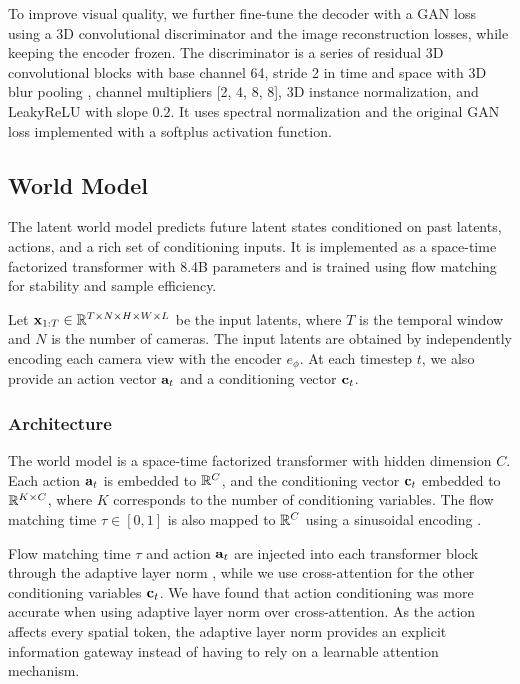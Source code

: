 To improve visual quality, we further fine-tune the decoder with a GAN loss \citep{esser21} using a 3D convolutional discriminator and the image reconstruction losses, while keeping the encoder frozen. The discriminator is a series of residual 3D convolutional blocks with base channel 64, stride 2 in time and space with 3D blur pooling \citep{zhang2019shiftinvar}, channel multipliers [2, 4, 8, 8], 3D instance normalization, and LeakyReLU with slope $0.2$. It uses spectral normalization \citep{miyato18} and the original GAN loss implemented with a softplus activation function.



\subsection{World Model}
The latent world model predicts future latent states conditioned on past latents, actions, and a rich set of conditioning inputs. It is implemented as a space-time factorized transformer with 8.4B parameters and is trained using flow matching~\cite{lipman23} for stability and sample efficiency.

Let ${\mathbf{x}}_{1:T} \in \mathbb{R}^{T \times N \times H \times W \times L}$ be the input latents, where $T$ is the temporal window and $N$ is the number of cameras. The input latents are obtained by independently encoding each camera view with the encoder $e_{\phi}$. At each timestep $t$, we also provide an action vector ${\mathbf{a}}_t$ and a conditioning vector ${\mathbf{c}}_t$.


\subsubsection{Architecture}

The world model is a space-time factorized transformer with hidden dimension $C$. Each action ${\mathbf{a}}_t$ is embedded to $\mathbb{R}^C$, and the conditioning vector ${\mathbf{c}}_t$ embedded to $\mathbb{R}^{K\times C}$, where $K$ corresponds to the number of conditioning variables. The flow matching time $\tau \in [0, 1]$ is also mapped to $\mathbb{R}^C$ using a sinusoidal encoding \cite{ho2020}.

Flow matching time $\tau$ and action ${\mathbf{a}}_t$ are injected into each transformer block through the adaptive layer norm \cite{peebles2023scalable}, while we use cross-attention for the other conditioning variables ${\mathbf{c}}_t$. We have found that action conditioning was more accurate when using adaptive layer norm over cross-attention. As the action affects every spatial token, the adaptive layer norm provides an explicit information gateway instead of having to rely on a learnable attention mechanism.

